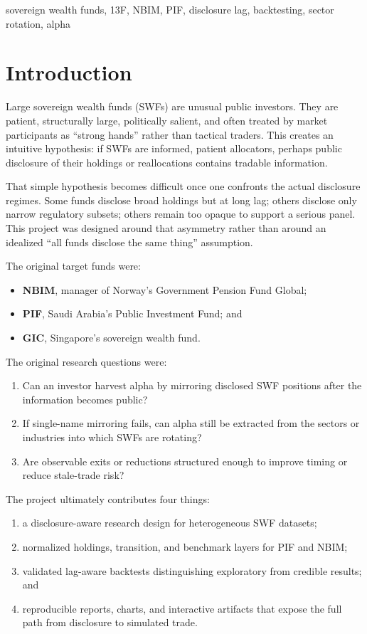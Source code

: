 \documentclass[conference]{IEEEtran}
\begin{document}
\begin{IEEEkeywords}
sovereign wealth funds, 13F, NBIM, PIF, disclosure lag, backtesting, sector rotation, alpha
\end{IEEEkeywords}

\section{Introduction}

Large sovereign wealth funds (SWFs) are unusual public investors. They are patient, structurally large, politically salient, and often treated by market participants as ``strong hands'' rather than tactical traders. This creates an intuitive hypothesis: if SWFs are informed, patient allocators, perhaps public disclosure of their holdings or reallocations contains tradable information.

That simple hypothesis becomes difficult once one confronts the actual disclosure regimes. Some funds disclose broad holdings but at long lag; others disclose only narrow regulatory subsets; others remain too opaque to support a serious panel. This project was designed around that asymmetry rather than around an idealized ``all funds disclose the same thing'' assumption.

The original target funds were:
\begin{itemize}[leftmargin=1.4em]
    \item \textbf{NBIM}, manager of Norway's Government Pension Fund Global;
    \item \textbf{PIF}, Saudi Arabia's Public Investment Fund; and
    \item \textbf{GIC}, Singapore's sovereign wealth fund.
\end{itemize}

The original research questions were:
\begin{enumerate}[leftmargin=1.4em]
    \item Can an investor harvest alpha by mirroring disclosed SWF positions after the information becomes public?
    \item If single-name mirroring fails, can alpha still be extracted from the sectors or industries into which SWFs are rotating?
    \item Are observable exits or reductions structured enough to improve timing or reduce stale-trade risk?
\end{enumerate}

The project ultimately contributes four things:
\begin{enumerate}[leftmargin=1.4em]
    \item a disclosure-aware research design for heterogeneous SWF datasets;
    \item normalized holdings, transition, and benchmark layers for PIF and NBIM;
    \item validated lag-aware backtests distinguishing exploratory from credible results; and
    \item reproducible reports, charts, and interactive artifacts that expose the full path from disclosure to simulated trade.
\end{enumerate}
\end{document}
